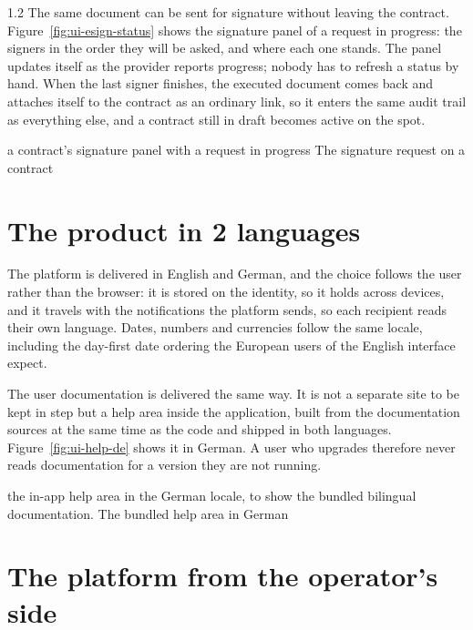 \begin{spacing}{1.2}
The same document can be sent for signature without leaving the
contract. Figure~\ref{fig:ui-esign-status} shows the signature panel of
a request in progress: the signers in the order they will be asked, and
where each one stands. The panel updates itself as the provider reports
progress; nobody has to refresh a status by hand. When the last signer
finishes, the executed document comes back and attaches itself to the
contract as an ordinary link, so it enters the same audit trail as
everything else, and a contract still in draft becomes active on the
spot.

  {a contract's signature panel with a request in progress}
  {The signature request on a contract}

\section{The product in 2 languages}
\label{sec:walk-i18n}

The platform is delivered in English and German, and the choice follows
the user rather than the browser: it is stored on the identity, so it
holds across devices, and it travels with the notifications the platform
sends, so each recipient reads their own language. Dates, numbers and
currencies follow the same locale, including the day-first date ordering
the European users of the English interface expect.

The user documentation is delivered the same way. It is not a separate
site to be kept in step but a help area inside the application, built
from the documentation sources at the same time as the code and shipped
in both languages. Figure~\ref{fig:ui-help-de} shows it in German. A
user who upgrades therefore never reads documentation for a version they
are not running.

\vspace{1cm}

  {the in-app help area in the German locale, to show the bundled
   bilingual documentation.}
  {The bundled help area in German}

\section{The platform from the operator's side}
\label{sec:walk-admin}


\end{spacing}
